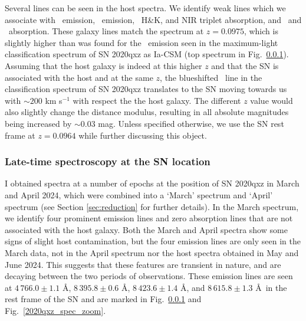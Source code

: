 \documentclass[a4paper,oneside,12pt, class=Latex/Classes/PhDthesisPSnPDF, crop=false]{standalone}
\begin{document}
Several lines can be seen in the host spectra. We identify weak lines which we associate with \Halpha\ emission, \SIIF\ emission, \CaII\ H\&K, and NIR triplet absorption, and \NaID\ and \MgI\ absorption. These galaxy lines match the spectrum at $z=0.0975$, which is slightly higher than was found for the \Halpha\ emission seen in the maximum-light classification spectrum of SN 2020qxz as Ia-CSM (top spectrum in Fig.~\ref{2020qxz_spec}). Assuming that the host galaxy is indeed at this higher $z$ and that the SN is associated with the host and at the same $z$, the blueshifted \Halpha\ line in the classification spectrum of SN 2020qxz translates to the SN moving towards us with $\sim200$ km s$^{-1}$ with respect the the host galaxy. The different $z$ value would also slightly change the distance modulus, resulting in all absolute magnitudes being increased by $\sim0.03$ mag. Unless specified otherwise, we use the SN rest frame at $z=0.0964$ while further discussing this object.


\subsubsection{Late-time spectroscopy at the SN location}
\label{2020qxz_spec}
I obtained spectra at a number of epochs at the position of SN 2020qxz in March and April 2024, which were combined into a `March' spectrum and `April' spectrum (see Section \ref{sec:reduction} for further details). In the March spectrum, we identify four prominent emission lines and zero absorption lines that are not associated with the host galaxy. Both the March and April spectra show some signs of slight host contamination, but the four emission lines are only seen in the March data, not in the April spectrum nor the host spectra obtained in May and June 2024. This suggests that these features are transient in nature, and are decaying between the two periods of observations. These emission lines are seen at $4\,766.0\pm1.1$ \AA, $8\,395.8\pm0.6$ \AA,  $8\,423.6\pm1.4$ \AA, and $8\,615.8\pm1.3$ \AA\ in the rest frame of the SN and are marked in Fig.~\ref{2020qxz_spec} and Fig.~\ref{2020qxz_spec_zoom}.
\end{document}
